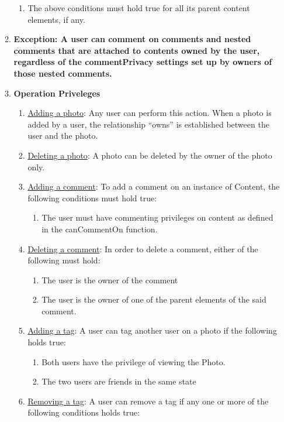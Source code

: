 \documentclass[titlepage]{article}
\begin{document}
\begin{enumerate}
\begin{enumerate}
\begin{enumerate}
		      \item The above conditions must hold true for all its parent content elements, if any.
	      \end{enumerate}
	      \item\textbf{Exception: A user can comment on comments and nested comments that are attached to contents owned by the user, regardless of the commentPrivacy settings set up by owners of those nested comments.}
	      \item\textbf{Operation Priveleges}
	      \begin{enumerate}
		      \item \underline{Adding a photo}: Any user can perform this action. When a photo is added by a user, the relationship “owns” is established between the user and the photo.
		      \item \underline{Deleting a photo}: A photo can be deleted by the owner of the photo only.
		      \item \underline{Adding a comment}: To add a comment on an instance of Content, the following conditions must hold true:
		            \begin{enumerate}
			            \item The user must have commenting privileges on content as defined in the canCommentOn function.
		            \end{enumerate}
		      \item \underline{Deleting a comment}: In order to delete a comment, either of the following must hold:
		            \begin{enumerate}
			            \item The user is the owner of the comment
			            \item The user is the owner of one of the parent elements of the said comment.
			                  \end {enumerate}
			            \item \underline{Adding a tag}: A user can tag another user on a photo if the following holds true:
			                  \begin{enumerate}
				                  \item Both users have the privilege of viewing the Photo.
				                  \item The two users are friends in the same state
			                  \end{enumerate}
			            \item \underline{Removing a tag}: A user can remove a tag if any one or more of the following conditions holds true:

\end{enumerate}
\end{enumerate}
\end{enumerate}
\end{document}
